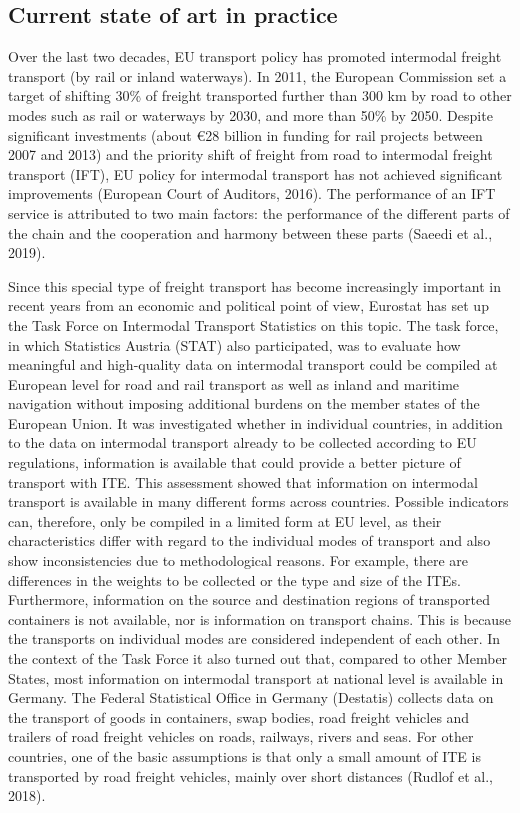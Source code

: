 \documentclass[
]{book}
\begin{document}
\hypertarget{current-state-of-art-in-practice-18}{%
\subsection*{Current state of art in practice}\label{current-state-of-art-in-practice-18}}

Over the last two decades, EU transport policy has promoted intermodal freight transport (by rail or inland waterways). In 2011, the European Commission set a target of shifting 30\% of freight transported further than 300 km by road to other modes such as rail or waterways by 2030, and more than 50\% by 2050. Despite significant investments (about €28 billion in funding for rail projects between 2007 and 2013) and the priority shift of freight from road to intermodal freight transport (IFT), EU policy for intermodal transport has not achieved significant improvements (European Court of Auditors, 2016). The performance of an IFT service is attributed to two main factors: the performance of the different parts of the chain and the cooperation and harmony between these parts (Saeedi et al., 2019).

Since this special type of freight transport has become increasingly important in recent years from an economic and political point of view, Eurostat has set up the Task Force on Intermodal Transport Statistics on this topic. The task force, in which Statistics Austria (STAT) also participated, was to evaluate how meaningful and high-quality data on intermodal transport could be compiled at European level for road and rail transport as well as inland and maritime navigation without imposing additional burdens on the member states of the European Union. It was investigated whether in individual countries, in addition to the data on intermodal transport already to be collected according to EU regulations, information is available that could provide a better picture of transport with ITE. This assessment showed that information on intermodal transport is available in many different forms across countries. Possible indicators can, therefore, only be compiled in a limited form at EU level, as their characteristics differ with regard to the individual modes of transport and also show inconsistencies due to methodological reasons. For example, there are differences in the weights to be collected or the type and size of the ITEs. Furthermore, information on the source and destination regions of transported containers is not available, nor is information on transport chains. This is because the transports on individual modes are considered independent of each other. In the context of the Task Force it also turned out that, compared to other Member States, most information on intermodal transport at national level is available in Germany. The Federal Statistical Office in Germany (Destatis) collects data on the transport of goods in containers, swap bodies, road freight vehicles and trailers of road freight vehicles on roads, railways, rivers and seas. For other countries, one of the basic assumptions is that only a small amount of ITE is transported by road freight vehicles, mainly over short distances (Rudlof et al., 2018).
\end{document}
